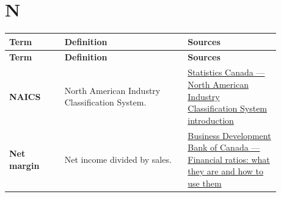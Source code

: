 \documentclass[11pt,letterpaper,oneside,openany]{book}
\begin{document}
\section[N]{N}
\begin{center}
\small
\setlength{\LTpre}{0.4em}
\setlength{\LTpost}{0.8em}
\begin{longtable}{>{\RaggedRight\arraybackslash}p{0.180\linewidth}>{\RaggedRight\arraybackslash}p{0.400\linewidth}>{\RaggedRight\arraybackslash}p{0.300\linewidth}}
\rowcolor{DeepNavy}
\color{white}\bfseries Term & \color{white}\bfseries Definition & \color{white}\bfseries Sources \\
\endfirsthead
\rowcolor{DeepNavy}
\color{white}\bfseries Term & \color{white}\bfseries Definition & \color{white}\bfseries Sources \\
\endhead
\textbf{NAICS} & North American Industry Classification System. & \href{https://www.statcan.gc.ca/en/subjects/standard/naics/2022/v1/introduction}{Statistics Canada --- North American Industry Classification System introduction} \\
\textbf{Net margin} & Net income divided by sales. & \href{https://www.bdc.ca/en/articles-tools/money-finance/manage-finances/financial-ratios-what-are-how-use}{Business Development Bank of Canada --- Financial ratios: what they are and how to use them} \\
\end{longtable}
\end{center}
\end{document}
